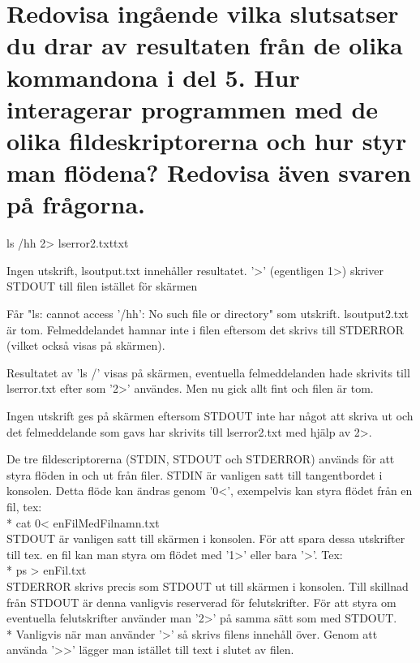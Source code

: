 \documentclass[11pt]{article}
\begin{document}
\section{Redovisa ingående vilka slutsatser du drar av resultaten från de olika kommandona i del 5. Hur interagerar programmen med de olika fildeskriptorerna och hur styr man flödena? Redovisa även svaren på frågorna.}
\begin{labeling}{ls /hh 2> lserror2.txttxt}
\item [ls / > lsoutput.txt]
Ingen utskrift, lsoutput.txt innehåller resultatet. '>' (egentligen 1>) skriver STDOUT till filen istället för skärmen

\item [ls /hh > lsoutput2.txt]
Får "ls: cannot access '/hh': No such file or directory" som utskrift. lsoutput2.txt är tom. Felmeddelandet hamnar inte i filen eftersom det skrivs till STDERROR (vilket också visas på skärmen).

\item [ls / 2> lserror.txt]
Resultatet av 'ls /' visas på skärmen, eventuella felmeddelanden hade skrivits till lserror.txt efter som '2>' användes. Men nu gick allt fint och filen är tom.

\item [ls /hh 2> lserror2.txt]
Ingen utskrift ges på skärmen eftersom STDOUT inte har något att skriva ut och det felmeddelande som gavs har skrivits till lserror2.txt med hjälp av 2>.
\end{labeling}

De tre fildescriptorerna (STDIN, STDOUT och STDERROR) används för att styra flöden in och ut från filer. STDIN är vanligen satt till tangentbordet i konsolen. Detta flöde kan ändras genom '0<', exempelvis kan styra flödet från en fil, tex:\\*
cat 0< enFilMedFilnamn.txt\\
STDOUT är vanligen satt till skärmen i konsolen. För att spara dessa utskrifter till tex. en fil kan man styra om flödet med '1>' eller bara '>'. Tex: \\*
ps > enFil.txt\\
STDERROR skrivs precis som STDOUT ut till skärmen i konsolen. Till skillnad från STDOUT är denna vanligvis reserverad för felutskrifter. För att styra om eventuella felutskrifter använder man '2>' på samma sätt som med STDOUT. \\*
Vanligvis när man använder '>' så skrivs filens innehåll över. Genom att använda '>>' lägger man istället till text i slutet av filen.
\end{document}
